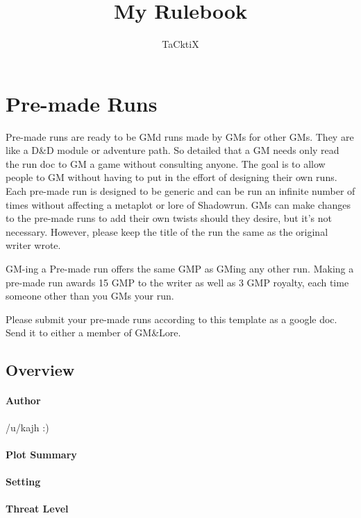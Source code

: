 \documentclass{ShadowTeXSR5}
\title{My Rulebook}
\author{TaCktiX}
\begin{document}
\srmaketitle[black]
\tableofcontents




\chapter{Pre-made Runs}

Pre-made runs are ready to be GMd runs made by GMs for other GMs. They are like a D\&D module or adventure path. So detailed that a GM needs only read the run doc to GM a game without consulting anyone. The goal is to allow people to GM without having to put in the effort of designing their own runs. Each pre-made run is designed to be generic and can be run an infinite number of times without affecting a metaplot or lore of Shadowrun. GMs can make changes to the pre-made runs to add their own twists should they desire, but it's not necessary. However, please keep the title of the run the same as the original writer wrote.

GM-ing a Pre-made run offers the same GMP as GMing any other run. Making a pre-made run awards 15 GMP to the writer as well as 3 GMP royalty, each time someone other than you GMs your run.

Please submit your pre-made runs according to this template as a google doc. Send it to either a member of GM\&Lore.


\section{Overview}
\subsubsection{Author}
/u/kajh :)
\subsubsection{Plot Summary}
\lipsum[1]
\subsubsection{Setting}
\lipsum[1]
\subsubsection{Threat Level}
\lipsum[1]
\end{document}
